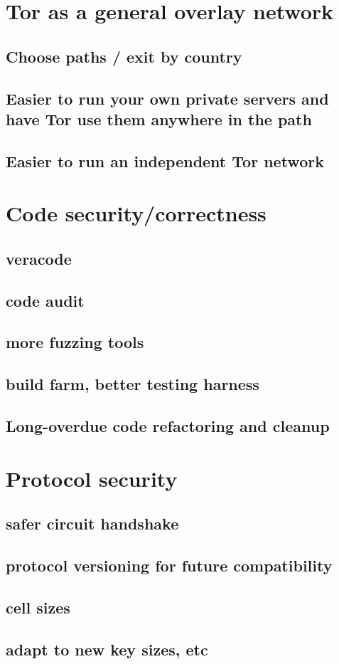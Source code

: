 \documentclass{article}
\begin{document}
\section{Tor as a general overlay network}
\subsection{Choose paths / exit by country}
\subsection{Easier to run your own private servers and have Tor use them
      anywhere in the path}
\subsection{Easier to run an independent Tor network}
\section{Code security/correctness}
\subsection{veracode}
\subsection{code audit}
\subsection{more fuzzing tools}
\subsection{build farm, better testing harness}
\subsection{Long-overdue code refactoring and cleanup}
\section{Protocol security}
\subsection{safer circuit handshake}
\subsection{protocol versioning for future compatibility}
\subsection{cell sizes}
\subsection{adapt to new key sizes, etc}

 
\end{document}
